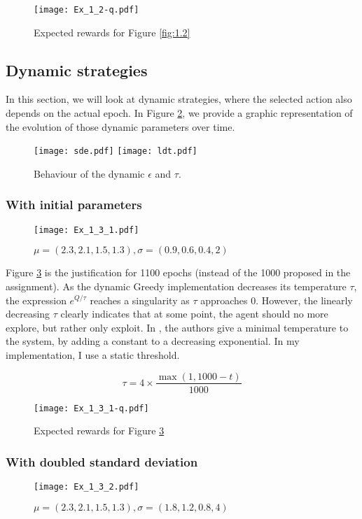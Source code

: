 \documentclass[a4paper,11pt]{article}
\begin{document}
\begin{figure}[H]
  \center
  \texttt{[image: Ex\_1\_2-q.pdf]}
  \caption{\label{fig:1.2q} Expected rewards for Figure \ref{fig:1.2}}
\end{figure}

\subsection{Dynamic strategies}
In this section, we will look at dynamic strategies, where the selected action also depends on the actual epoch. In Figure \ref{fig:timevar}, we provide a graphic representation of the evolution of those dynamic parameters over time.

\begin{figure}[H]
  \center
  \texttt{[image: sde.pdf]}
  \texttt{[image: ldt.pdf]}
  \caption{\label{fig:timevar} Behaviour of the dynamic $\epsilon$ and $\tau$.}
\end{figure}

\subsubsection{With initial parameters}
\begin{figure}[H]
  \center
  \texttt{[image: Ex\_1\_3\_1.pdf]}
  \caption{\label{fig:1.3.1} $\mu = (2.3, 2.1, 1.5, 1.3), \sigma = (0.9, 0.6, 0.4, 2)$}
\end{figure}

Figure \ref{fig:1.3.1} is the justification for 1100 epochs (instead of the 1000 proposed in the assignment). As the dynamic Greedy implementation decreases its temperature $\tau$, the expression $e^{Q/\tau}$ reaches a singularity as $\tau$ approaches 0. However, the linearly decreasing $\tau$ clearly indicates that at some point, the agent should no more explore, but rather only exploit. In \cite{Kapetanakis2005}, the authors give a minimal temperature to the system, by adding a constant to a decreasing exponential. In my implementation, I use a static threshold.

$$ \tau = 4 \times \frac{\max(1, 1000-t)}{1000} $$

\begin{figure}[H]
  \center
  \texttt{[image: Ex\_1\_3\_1-q.pdf]}
  \caption{\label{fig:1.3.1q} Expected rewards for Figure \ref{fig:1.3.1}}
\end{figure}

\subsubsection{With doubled standard deviation}
\begin{figure}[H]
  \center
  \texttt{[image: Ex\_1\_3\_2.pdf]}
  \caption{\label{fig:1.3.2} $\mu = (2.3, 2.1, 1.5, 1.3), \sigma = (1.8, 1.2, 0.8, 4)$}
\end{figure}
\end{document}
